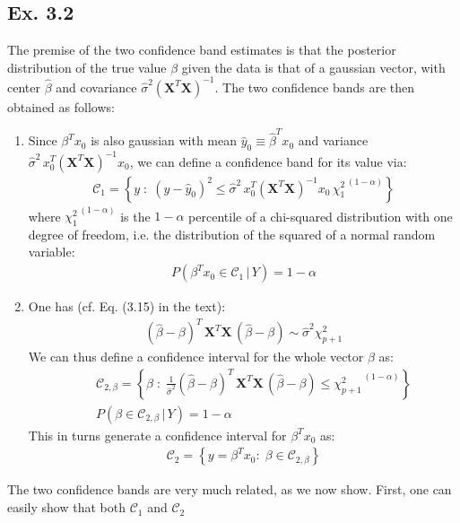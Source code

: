 \subsection*{Ex. 3.2 \seecode}
The premise of the two confidence band estimates is that the posterior
distribution of the true value $\beta$ given the data is that of a gaussian vector, 
with center $\hat{\beta}$ and covariance $ \hat{\sigma}^2 \left( \mathbf{X} ^T \mathbf{X}  \right) ^{-1}$.
The two confidence bands are then obtained as follows:
\begin{enumerate}
\item Since $\beta^T x_0$ is also gaussian with mean $\hat{y}_0 \equiv \hat{\beta}^T x_0$ and variance $\hat{\sigma}^2\, x_0^T ( \mathbf{X} ^T \mathbf{X})^{-1} x_0$, we can define a confidence band for its value via:
\begin{eqnarray*}
\mathcal{C}_1 =  \left\{ y \; : \; (y - \hat{y}_0)^2 \leq \hat{\sigma}^2 \, x_0^T ( \mathbf{X} ^T \mathbf{X})^{-1} x_0 \, {\chi_{1}^2} ^{\,(1- \alpha)} \right\}
\end{eqnarray*}
where ${\chi_{1}^2} ^{\,(1- \alpha)}$ is the $1 - \alpha$ percentile of a chi-squared distribution with one degree of freedom, i.e. the distribution of the squared of a normal random variable:
\begin{eqnarray*}
P(\beta^T x_0 \in \mathcal{C}_1 \, | \, Y) = 1 - \alpha
\end{eqnarray*}
\item One has (cf. Eq. (3.15) in the text):
\begin{eqnarray*}
( \hat{\beta} - \beta) ^T \, \mathbf{X}^T \mathbf{X} \, ( \hat{\beta} - \beta) \sim \hat{\sigma}^2 \chi_{p+1}^2
\end{eqnarray*}
We can thus define a confidence interval for the whole vector $\beta$ as:
\begin{eqnarray*}
&& \mathcal{C}_{2, \beta}  = \left\{ \beta \; : \;\frac{1}{\hat{\sigma}^2} ( \hat{\beta} - \beta) ^T \, \mathbf{X}^T \mathbf{X} \, ( \hat{\beta} - \beta) \leq  {\chi_{p + 1}^2} ^{\,(1- \alpha)} \right\} \\
&& P(\beta \in \mathcal{C}_{2, \beta} \, | \, Y)  =  1 - \alpha
\end{eqnarray*}
This in turns generate a confidence interval for $\beta^T x_0$ as:
\begin{eqnarray*}
\mathcal{C}_2 = \left\{ y = \beta^T x_0: \; \beta \in \mathcal{C}_{2, \beta} \right\}
\end{eqnarray*}
\end{enumerate}
The two confidence bands are very much related, as we now show. First, one can easily show that both $\mathcal{C}_1$ and $\mathcal{C}_2$
